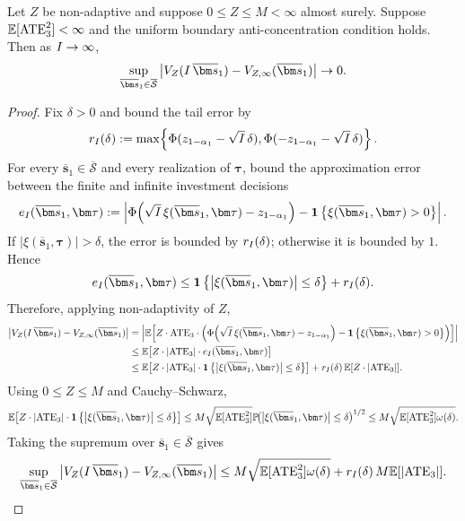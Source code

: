 \begin{proposition}
  \label{prop:large-investment-expansion-weighted-appendix}
  Let $Z$ be non-adaptive and suppose $0\le Z\le M<\infty$ almost surely.
  Suppose $\mathbb{E}[\mathrm{ATE}_3^2]<\infty$ and the uniform boundary anti-concentration condition  holds.
  Then as $I\to\infty$,
  \[
    \sup_{\overline{\bm s}_1\in\overline{\mathcal{S}}}
    \big|V_Z(\invst\,\overline{\bm s}_1)-V_{Z,\noisefree}(\overline{\bm s}_1)\big|
    \to 0.
  \]
\end{proposition}

\begin{proof}
  Fix $\delta>0$ and bound the tail error by
  \[
    r_{I}(\delta)
    :=
    \max\!\left\{
      \Phi(z_{1-\alpha_1}-\sqrt{I}\,\delta),
      \Phi(-z_{1-\alpha_1}-\sqrt{I}\,\delta)
    \right\}.
  \]
  For every $\overline{\bm s}_1\in\overline{\mathcal{S}}$ and every realization of $\bm\tau$, bound the approximation error between the finite and infinite investment decisions
  \[
    e_{\invst}(\overline{\bm s}_1,\bm\tau)
    \defeq
    \left|
    \Phi\!\left(
      \sqrt{\invst}\,\xi(\overline{\bm s}_1,\bm\tau)-z_{1-\alpha_1}
    \right)
    -
    \indic{\xi(\overline{\bm s}_1,\bm\tau)>0}
    \right|.
  \]
  If $|\xi(\overline{\bm s}_1,\bm\tau)|>\delta$, the error is bounded by $r_{I}(\delta)$; otherwise it is bounded by $1$.
  Hence
  \[
    e_{\invst}(\overline{\bm s}_1,\bm\tau)
    \le
    \indic{\big|\xi(\overline{\bm s}_1,\bm\tau)\big|\le\delta}
    +
    r_{\invst}(\delta).
  \]
  Therefore, applying non-adaptivity of $Z$,
  \begin{align*}
    \big|V_Z(\invst\,\overline{\bm s}_1)-V_{Z,\noisefree}(\overline{\bm s}_1)\big|
    &=
    \left|
    \E\!\left[
      Z\cdot \ATE_3\cdot
      \left(
        \Phi\!\left(
          \sqrt{\invst}\,\xi(\overline{\bm s}_1,\bm\tau)-z_{1-\alpha_1}
        \right)
        -
        \indic{\xi(\overline{\bm s}_1,\bm\tau)>0}
      \right)
    \right]
    \right| \\
    &\le
    \E\!\left[
      Z\cdot |\ATE_3|\cdot e_{\invst}(\overline{\bm s}_1,\bm\tau)
    \right] \\
    &\le
    \E\!\left[
      Z \cdot |\ATE_3|\cdot
      \indic{\big|\xi(\overline{\bm s}_1,\bm\tau)\big|\le\delta}
    \right]
    +
    r_{\invst}(\delta)\,\E[Z\cdot |\ATE_3|].
  \end{align*}
  Using $0\le Z\le M$ and Cauchy--Schwarz,
  \[
    \E\!\left[
      Z\cdot |\ATE_3|\cdot
      \indic{\big|\xi(\overline{\bm s}_1,\bm\tau)\big|\le\delta}
    \right]
    \le
    M\sqrt{\E[\ATE_3^2]}
    \P\!\big(\big|\xi(\overline{\bm s}_1,\bm\tau)\big|\le\delta\big)^{1/2}
    \le
    M\sqrt{\E[\ATE_3^2] \omega(\delta)}.
  \]
  Taking the supremum over $\overline{\bm s}_1\in\overline{\mathcal{S}}$ gives
  \[
    \sup_{\overline{\bm s}_1\in\overline{\mathcal{S}}}
    \big|V_Z(\invst\,\overline{\bm s}_1)-V_{Z,\noisefree}(\overline{\bm s}_1)\big|
    \le
    M\sqrt{\E[\ATE_3^2]\omega(\delta)}
    +
    r_{\invst}(\delta)\,M\E[|\ATE_3|].
  \]


\end{proof}
